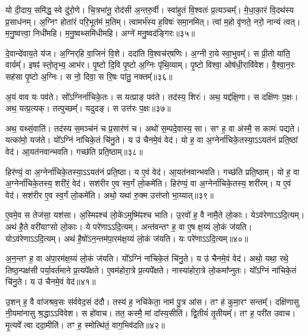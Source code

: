    यो दी॒दाय॒ समि॑द्ध॒ स्वे दु॑रो॒णे।
   चि॒त्रभा॑नू॒ रोद॑सी अ॒न्तरु॒र्वी।
   स्वा॑हुतं वि॒श्वतः॑ प्र॒त्यञ्चम्᳚।
   मे॒धा॒का॒रं वि॒दथ॑स्य प्र॒साध॑नम्।
   अ॒ग्निꣳ होता॑रं परि॒भूत॑मं म॒तिम्।
   त्वामर्भ॑स्य ह॒विषः॑ समा॒नमित्।
   त्वां म॒हो वृ॑णते॒ नरो॒ नान्यं त्वत्।
   म॒नु॒ष्वत्त्वा॒ निधी॑महि।
   म॒नु॒ष्वथ्समि॑धीमहि।
   अग्ने॑ मनु॒ष्वद॑ङ्गिरः॥३५॥

   दे॒वान्दे॑वाय॒ते य॑ज।
   अ॒ग्निर्{‌}हि वा॒जिनं॑ वि॒शे।
   ददा॑ति वि॒श्वच॑र्{‌}षणिः।
   अ॒ग्नी रा॒ये स्वा॒भुवम्᳚।
   स प्री॒तो या॑ति॒ वार्यम्᳚।
   इषꣴ॑ स्तो॒तृभ्य॒ आभ॑र।
   पृ॒ष्टो दि॒वि पृ॒ष्टो अ॒ग्निः पृ॑थि॒व्याम्।
   पृ॒ष्टो विश्वा॒ ओष॑धी॒रावि॑वेश।
   वै॒श्वा॒न॒रः सह॑सा पृ॒ष्टो अ॒ग्निः।
   स नो॒ दिवा॒ स रि॒षः पा॑तु॒ नक्तम्᳚॥३६॥
\anuvakamend
  
   अ॒यं वाव यः पव॑ते।
   सो᳚ऽग्निर्ना॑चिके॒तः।
   स यत्प्राङ् पव॑ते।
   तद॑स्य॒ शिरः॑।
   अथ॒ यद्द॑क्षि॒णा।
   स दक्षि॑णः प॒क्षः।
   अथ॒ यत्प्र॒त्यक्।
   तत्पुच्छम्᳚।
   यदुदङ्{‌}\sG{}।
   स उत्त॑रः प॒क्षः॥३७॥

   अथ॒ यथ्सं॒वाति॑।
   तद॑स्य स॒मञ्च॑नं च प्र॒सार॑णं च।
   अथो॑ स॒म्पदे॒वास्य॒ सा।
   सꣳ ह॒ वा अ॑स्मै॒ स कामः॑ पद्यते।
   यत्का॑मो॒ यज॑ते।
   यो᳚ऽग्निं ना॑चिके॒तं चि॑नु॒ते।
   य उ॑ चैनमे॒वं वेद॑।
   यो ह॒ वा अ॒ग्नेर्ना॑चिके॒तस्या॒ऽऽयत॑नं प्रति॒ष्ठां वेद॑।
   आ॒यत॑नवान्भवति।
   गच्छ॑ति प्रति॒ष्ठाम्॥३८॥

   हिर॑ण्यं॒ वा अ॒ग्नेर्ना॑चिके॒तस्या॒ऽऽयत॑नं प्रति॒ष्ठा।
   य ए॒वं वेद॑।
   आ॒यत॑नवान्भवति।
   गच्छ॑ति प्रति॒ष्ठाम्।
   यो ह॒ वा अ॒ग्नेर्ना॑चिके॒तस्य॒ शरी॑रं॒ वेद॑।
   सश॑रीर ए॒व स्व॒र्गं लो॒कमे॑ति।
   हिर॑ण्यं॒ वा अ॒ग्नेर्ना॑चिके॒तस्य॒ शरी॑रम्।
   य ए॒वं वेद॑।
   सश॑रीर ए॒व स्व॒र्गं लो॒कमे॑ति।
   अथो॒ यथा॑ रु॒क्म उत्त॑प्तो भा॒य्यात्॥३९॥

   ए॒वमे॒व स तेज॑सा॒ यश॑सा।
   अ॒स्मिꣴश्च॑ लो॒के॑ऽमुष्मि॑ꣴश्च भाति।
   उ॒रवो॑ ह॒ वै नामै॒ते लो॒काः।
   येऽव॑रेणाऽऽदि॒त्यम्।
   अथ॑ है॒ते वरी॑याꣳसो लो॒काः।
   ये परे॑णाऽऽदि॒त्यम्।
   अन्त॑वन्तꣳ ह॒ वा ए॒ष क्ष॒य्यं लो॒कं ज॑यति।
   योऽव॑रेणाऽऽदि॒त्यम्।
   अथ॑ है॒षो॑ऽन॒न्तम॑पा॒रम॑क्ष॒य्यं लो॒कं ज॑यति।
   यः परे॑णाऽऽदि॒त्यम्॥४०॥
   
   अ॒न॒न्तꣳ ह॒ वा अ॑पा॒रम॑क्ष॒य्यं लो॒कं ज॑यति।
   यो᳚ऽग्निं ना॑चिके॒तं चि॑नु॒ते।
   य उ॑ चैनमे॒वं वेद॑।
   अथो॒ यथा॒ रथे॒ तिष्ठ॒न्पक्ष॑सी पर्या॒वर्त॑माने प्र॒त्यपे᳚क्षते।
   ए॒वम॑होरा॒त्रे प्र॒त्यपे᳚क्षते।
   नास्या॑होरा॒त्रे लो॒कमा᳚प्नुतः।
   यो᳚ऽग्निं ना॑चिके॒तं चि॑नु॒ते।
   य उ॑ चैनमे॒वं वेद॑॥४१॥
\anuvakamend
  
   उ॒शन् ह॒ वै वा॑जश्रव॒सः स॑र्ववेद॒सं द॑दौ।
   तस्य॑ ह॒ नचि॑केता॒ नाम॑ पु॒त्र आ॑स।
   तꣳ ह॑ कुमा॒रꣳ सन्तम्᳚।
   दक्षि॑णासु नी॒यमा॑नासु श्र॒द्धाऽऽवि॑वेश।
   स हो॑वाच।
   तत॒ कस्मै॒ मां दा᳚स्य॒सीति॑।
   द्वि॒तीयं॑ तृ॒तीयम्᳚।
   तꣳ ह॒ परी॑त उवाच।
   मृ॒त्यवे᳚ त्वा ददा॒मीति॑।
   तꣳ ह॒ स्मोत्थि॑तं॒ वाग॒भिव॑दति॥४२॥

